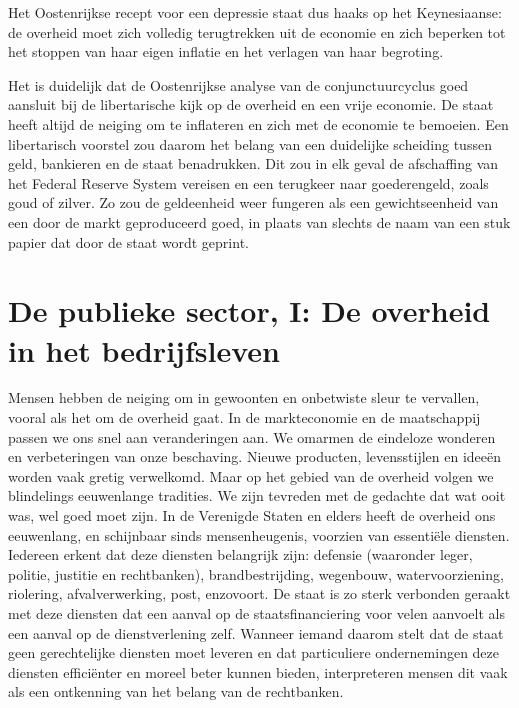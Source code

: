 \documentclass[
  a5paper,
  smalldemyvopaper,10pt,twoside,onecolumn,openright,extrafontsizes,hidelinks]{memoir}
\begin{document}
Het Oostenrijkse recept voor een depressie staat dus haaks op het
Keynesiaanse: de overheid moet zich volledig terugtrekken uit de
economie en zich beperken tot het stoppen van haar eigen inflatie en het
verlagen van haar begroting.

Het is duidelijk dat de Oostenrijkse analyse van de conjunctuurcyclus
goed aansluit bij de libertarische kijk op de overheid en een vrije
economie. De staat heeft altijd de neiging om te inflateren en zich met
de economie te bemoeien. Een libertarisch voorstel zou daarom het belang
van een duidelijke scheiding tussen geld, bankieren en de staat
benadrukken. Dit zou in elk geval de afschaffing van het Federal Reserve
System vereisen en een terugkeer naar goederengeld, zoals goud of
zilver. Zo zou de geldeenheid weer fungeren als een gewichtseenheid van
een door de markt geproduceerd goed, in plaats van slechts de naam van
een stuk papier dat door de staat wordt geprint.


\chapter{De publieke sector, I: De overheid in het
bedrijfsleven}\label{de-publieke-sector-i-de-overheid-in-het-bedrijfsleven}

Mensen hebben de neiging om in gewoonten en onbetwiste sleur te
vervallen, vooral als het om de overheid gaat. In de markteconomie en de
maatschappij passen we ons snel aan veranderingen aan. We omarmen de
eindeloze wonderen en verbeteringen van onze beschaving. Nieuwe
producten, levensstijlen en ideeën worden vaak gretig verwelkomd. Maar
op het gebied van de overheid volgen we blindelings eeuwenlange
tradities. We zijn tevreden met de gedachte dat wat ooit was, wel goed
moet zijn. In de Verenigde Staten en elders heeft de overheid ons
eeuwenlang, en schijnbaar sinds mensenheugenis, voorzien van essentiële
diensten. Iedereen erkent dat deze diensten belangrijk zijn: defensie
(waaronder leger, politie, justitie en rechtbanken), brandbestrijding,
wegenbouw, watervoorziening, riolering, afvalverwerking, post,
enzovoort. De staat is zo sterk verbonden geraakt met deze diensten dat
een aanval op de staatsfinanciering voor velen aanvoelt als een aanval
op de dienstverlening zelf. Wanneer iemand daarom stelt dat de staat
geen gerechtelijke diensten moet leveren en dat particuliere
ondernemingen deze diensten efficiënter en moreel beter kunnen bieden,
interpreteren mensen dit vaak als een ontkenning van het belang van de
rechtbanken.
\end{document}

